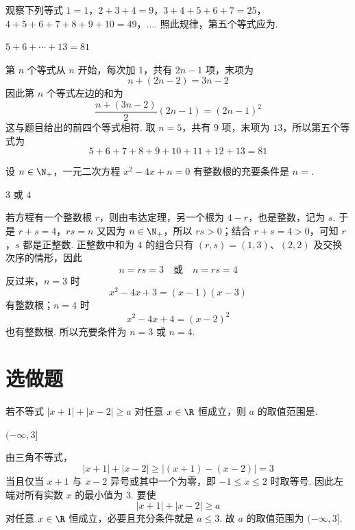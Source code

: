 \begin{problem}
观察下列等式 \(1 = 1\)，\(2 + 3 + 4 = 9\)，\(3 + 4 + 5 + 6 + 7 = 25\)，\(4 + 5 + 6 + 7 + 8 + 9 + 10 = 49\)，\(\dots\). 照此规律，第五个等式应为\fillinblank{}.
\end{problem}

\begin{answer}
\(5+6+\cdots+13=81\)
\end{answer}

\begin{solution}
第 \(n\) 个等式从 \(n\) 开始，每次加 \(1\)，共有 \(2n-1\) 项，末项为
\[
n+(2n-2)=3n-2
\]
因此第 \(n\) 个等式左边的和为
\[
\frac{n+(3n-2)}{2}(2n-1)=(2n-1)^2
\]
这与题目给出的前四个等式相符. 取 \(n=5\)，共有 \(9\) 项，末项为 \(13\)，所以第五个等式为
\[
5+6+7+8+9+10+11+12+13=81
\]
\end{solution}

\begin{problem}
设 \(n \in \N_{+}\)，一元二次方程 \(x^{2} - 4x + n = 0\) 有整数根的充要条件是 \(n=\)\fillinblank{}.
\end{problem}

\begin{answer}
\(3\) 或 \(4\)
\end{answer}

\begin{solution}
若方程有一个整数根 \(r\)，则由韦达定理，另一个根为 \(4-r\)，也是整数，记为 \(s\). 于是
\(r+s=4\)，\(rs=n\)
又因为 \(n\in\N_+\)，所以 \(rs>0\)；结合 \(r+s=4>0\)，可知 \(r\)，\(s\) 都是正整数. 正整数中和为 \(4\) 的组合只有 \((r,s)=(1,3)\)、\((2,2)\) 及交换次序的情形，因此
\[
n=rs=3\quad\text{或}\quad n=rs=4
\]
反过来，\(n=3\) 时
\[
x^2-4x+3=(x-1)(x-3)
\]
有整数根；\(n=4\) 时
\[
x^2-4x+4=(x-2)^2
\]
也有整数根. 所以充要条件为 \(n=3\) 或 \(n=4\).
\end{solution}

\section{选做题}

\begin{problem}
若不等式 \( |x+1|+|x-2|\geqslant a \) 对任意 \( x\in\R \) 恒成立，则 \(a\) 的取值范围是\fillinblank{}.
\end{problem}

\begin{answer}
\((-\infty,3]\)
\end{answer}

\begin{solution}
由三角不等式，
\[
|x+1|+|x-2|\geqslant |(x+1)-(x-2)|=3
\]
当且仅当 \(x+1\) 与 \(x-2\) 异号或其中一个为零，即 \(-1\leqslant x\leqslant2\) 时取等号. 因此左端对所有实数 \(x\) 的最小值为 \(3\). 要使
\[
|x+1|+|x-2|\geqslant a
\]
对任意 \(x\in\R\) 恒成立，必要且充分条件就是 \(a\leqslant3\). 故 \(a\) 的取值范围为 \((-\infty,3]\).
\end{solution}

